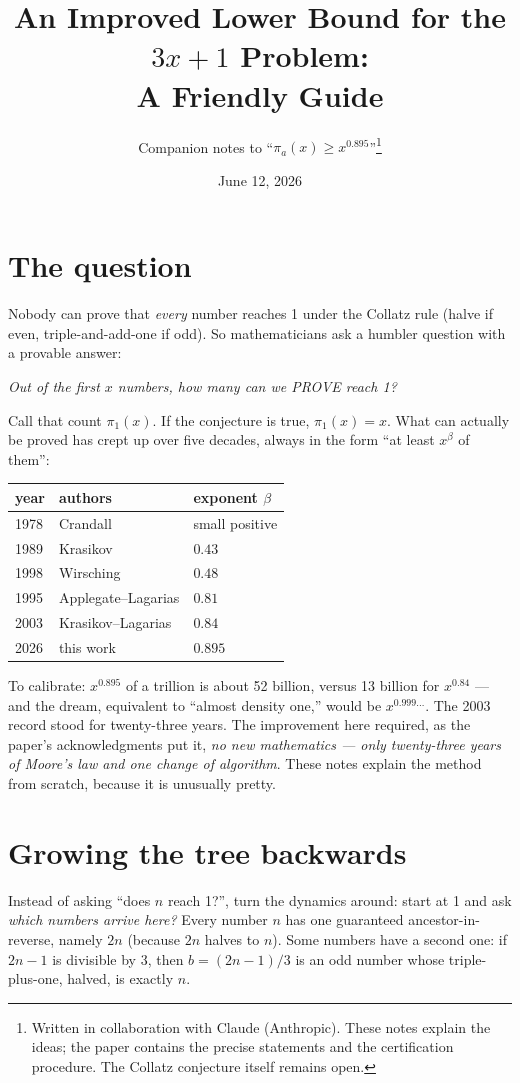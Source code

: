 \documentclass[11pt]{article}
\title{An Improved Lower Bound for the $3x+1$ Problem:\\
       \Large A Friendly Guide}
\author{Companion notes to ``$\pi_a(x) \ge x^{0.895}$''\thanks{Written
in collaboration with Claude (Anthropic). These notes explain the ideas;
the paper contains the precise statements and the certification
procedure. The Collatz conjecture itself remains open.}}
\date{June 12, 2026}
\begin{document}
\maketitle

\section{The question}

Nobody can prove that \emph{every} number reaches 1 under the Collatz
rule (halve if even, triple-and-add-one if odd). So mathematicians ask a
humbler question with a provable answer:

\begin{center}
\emph{Out of the first $x$ numbers, how many can we PROVE reach 1?}
\end{center}

Call that count $\pi_1(x)$. If the conjecture is true, $\pi_1(x) = x$.
What can actually be proved has crept up over five decades, always in
the form ``at least $x^{\beta}$ of them'':
\begin{center}
\begin{tabular}{lll}
\toprule
year & authors & exponent $\beta$ \\
\midrule
1978 & Crandall & small positive \\
1989 & Krasikov & $0.43$ \\
1998 & Wirsching & $0.48$ \\
1995 & Applegate--Lagarias & $0.81$ \\
2003 & Krasikov--Lagarias & $0.84$ \\
2026 & this work & $\mathbf{0.895}$ \\
\bottomrule
\end{tabular}
\end{center}
To calibrate: $x^{0.895}$ of a trillion is about 52 billion, versus 13
billion for $x^{0.84}$ --- and the dream, equivalent to ``almost
density one,'' would be $x^{0.999\ldots}$. The 2003 record stood for
twenty-three years. The improvement here required, as the paper's
acknowledgments put it, \emph{no new mathematics --- only twenty-three
years of Moore's law and one change of algorithm}. These notes explain
the method from scratch, because it is unusually pretty.

\section{Growing the tree backwards}

Instead of asking ``does $n$ reach 1?'', turn the dynamics around:
start at 1 and ask \emph{which numbers arrive here?} Every number $n$
has one guaranteed ancestor-in-reverse, namely $2n$ (because $2n$
halves to $n$). Some numbers have a second one: if $2n - 1$ is
divisible by 3, then $b = (2n-1)/3$ is an odd number whose
triple-plus-one, halved, is exactly $n$.
\end{document}
